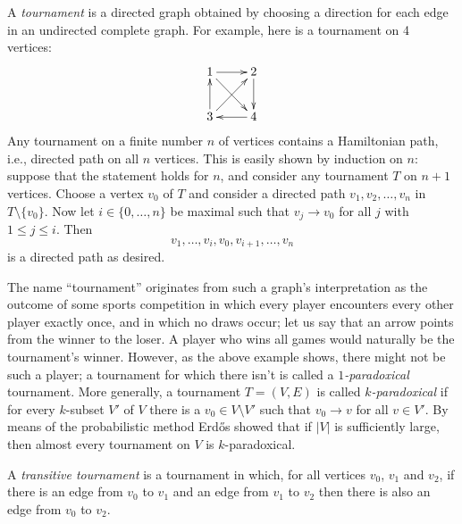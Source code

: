 \documentclass[12pt]{article}
\begin{document}
A \emph{tournament} is a directed graph obtained by choosing a
direction for each edge in an undirected complete graph.
For example, here is a tournament on 4 vertices:
\[ \xymatrix{
        1 \ar[dr] \ar[r] &2 \ar[d]\\
        3 \ar[u] \ar[ur] &4 \ar[l]}
\]
Any tournament on a finite number $n$ of vertices contains a Hamiltonian path, i.e., directed path on all $n$ vertices. This is easily shown by induction on $n$:
suppose that the statement holds for $n$, and consider any
tournament $T$ on $n+1$ vertices. Choose a vertex $v_0$ of $T$ and
consider a directed path $v_1,v_2,\ldots,v_n$ in $T\setminus \{v_0\}$.
Now let $i \in \{0,\ldots,n\}$ be maximal such that $v_j \rightarrow
v_0$ for all $j$ with $1 \leq j \leq i$. Then
\[ v_1,\ldots,v_i,v_0,v_{i+1},\ldots,v_n \]
is a directed path as desired.

The name ``tournament'' originates from such a graph's interpretation as
the outcome of some sports competition in which every player encounters
every other player exactly once, and in which no draws occur; let us say
that an arrow points from the winner to the loser. A player who wins
all games would naturally be the tournament's winner. However, as the
above example shows, there might not be such a player; a tournament for
which there isn't is called a {\em $1$-paradoxical} tournament. More
generally, a tournament $T=(V,E)$ is called {\em $k$-paradoxical} if
for every $k$-subset $V'$ of $V$ there is a $v_0 \in V \setminus V'$
such that $v_0 \rightarrow v$ for all $v \in V'$. By means of the
probabilistic method Erd\H{o}s showed that if $|V|$ is sufficiently
large, then almost every tournament on $V$ is $k$-paradoxical.

A \emph{transitive tournament} is a tournament in which, for all vertices $v_0$, $v_1$ and $v_2$, if there is an edge from $v_0$ to $v_1$ and an edge from $v_1$ to $v_2$ then there is also an edge from $v_0$ to $v_2$.
\end{document}
